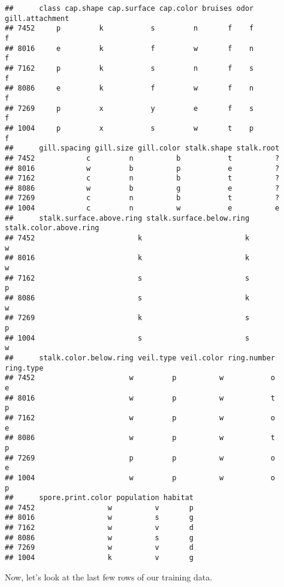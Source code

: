 \documentclass[
]{article}
\begin{document}
\begin{verbatim}
##      class cap.shape cap.surface cap.color bruises odor gill.attachment
## 7452     p         k           s         n       f    f               f
## 8016     e         k           f         w       f    n               f
## 7162     p         k           s         n       f    s               f
## 8086     e         k           f         w       f    n               f
## 7269     p         x           y         e       f    s               f
## 1004     p         x           s         w       t    p               f
##      gill.spacing gill.size gill.color stalk.shape stalk.root
## 7452            c         n          b           t          ?
## 8016            w         b          p           e          ?
## 7162            c         n          b           t          ?
## 8086            w         b          g           e          ?
## 7269            c         n          b           t          ?
## 1004            c         n          w           e          e
##      stalk.surface.above.ring stalk.surface.below.ring stalk.color.above.ring
## 7452                        k                        k                      w
## 8016                        k                        k                      w
## 7162                        s                        s                      p
## 8086                        s                        k                      w
## 7269                        k                        s                      p
## 1004                        s                        s                      w
##      stalk.color.below.ring veil.type veil.color ring.number ring.type
## 7452                      w         p          w           o         e
## 8016                      w         p          w           t         p
## 7162                      w         p          w           o         e
## 8086                      w         p          w           t         p
## 7269                      p         p          w           o         e
## 1004                      w         p          w           o         p
##      spore.print.color population habitat
## 7452                 w          v       p
## 8016                 w          s       g
## 7162                 w          v       d
## 8086                 w          s       g
## 7269                 w          v       d
## 1004                 k          v       g
\end{verbatim}

Now, let's look at the last few rows of our training data.
\end{document}
